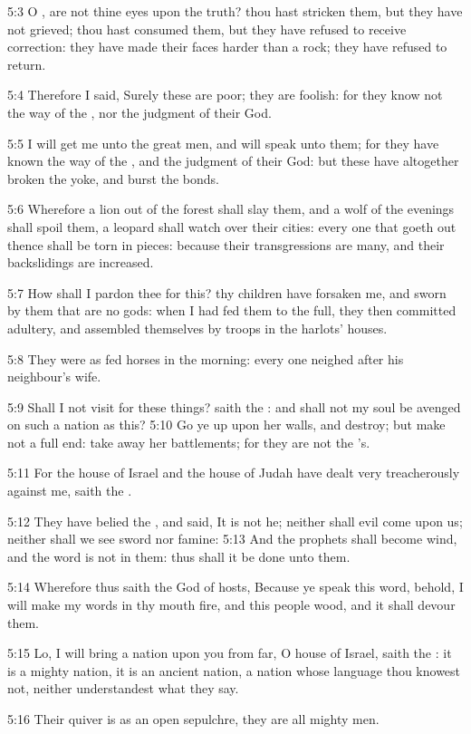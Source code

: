 5:3 O \LORD, are not thine eyes upon the truth? thou hast stricken
them, but they have not grieved; thou hast consumed them, but they
have refused to receive correction: they have made their faces harder
than a rock; they have refused to return.

5:4 Therefore I said, Surely these are poor; they are foolish: for
they know not the way of the \LORD, nor the judgment of their God.

5:5 I will get me unto the great men, and will speak unto them; for
they have known the way of the \LORD, and the judgment of their God:
but these have altogether broken the yoke, and burst the bonds.

5:6 Wherefore a lion out of the forest shall slay them, and a wolf of
the evenings shall spoil them, a leopard shall watch over their
cities: every one that goeth out thence shall be torn in pieces:
because their transgressions are many, and their backslidings are
increased.

5:7 How shall I pardon thee for this? thy children have forsaken me,
and sworn by them that are no gods: when I had fed them to the full,
they then committed adultery, and assembled themselves by troops in
the harlots' houses.

5:8 They were as fed horses in the morning: every one neighed after
his neighbour's wife.

5:9 Shall I not visit for these things? saith the \LORD: and shall not
my soul be avenged on such a nation as this?  5:10 Go ye up upon her
walls, and destroy; but make not a full end: take away her
battlements; for they are not the \LORD's.

5:11 For the house of Israel and the house of Judah have dealt very
treacherously against me, saith the \LORD.

5:12 They have belied the \LORD, and said, It is not he; neither shall
evil come upon us; neither shall we see sword nor famine: 5:13 And the
prophets shall become wind, and the word is not in them: thus shall it
be done unto them.

5:14 Wherefore thus saith the \LORD God of hosts, Because ye speak this
word, behold, I will make my words in thy mouth fire, and this people
wood, and it shall devour them.

5:15 Lo, I will bring a nation upon you from far, O house of Israel,
saith the \LORD: it is a mighty nation, it is an ancient nation, a
nation whose language thou knowest not, neither understandest what
they say.

5:16 Their quiver is as an open sepulchre, they are all mighty men.

